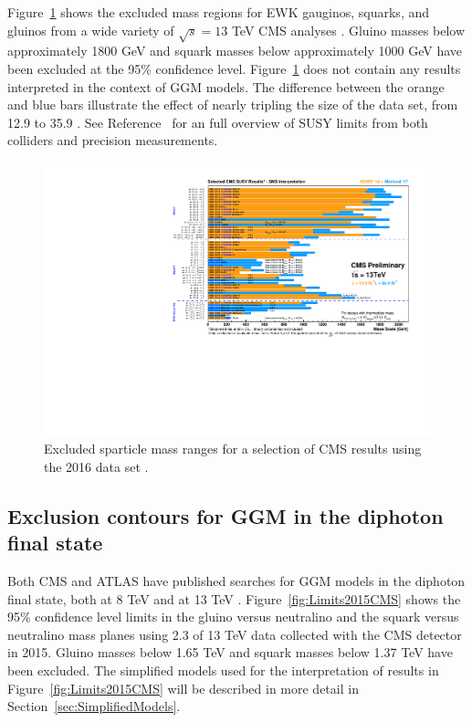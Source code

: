 Figure~\ref{fig:CMSexclusions} shows the excluded mass regions for EWK gauginos, squarks, and gluinos
from a wide variety of $\sqrt{s} = 13$ TeV CMS analyses \cite{SUSYtwiki}. Gluino masses below approximately 1800 GeV and 
squark masses below approximately 1000 GeV have been excluded at the 95\% confidence level. 
Figure~\ref{fig:CMSexclusions} does not contain any results interpreted in the context of GGM models.
The difference between the orange and blue bars illustrate the effect of nearly tripling the size of the
data set, from 12.9 \fbinv to 35.9 \fbinv. See Reference~\cite{pdgReview} for an full overview of SUSY 
limits from both colliders and precision measurements.

\begin{figure}[htbp]
    \centering
    \includegraphics[angle=90,origin=c,width=.9\textwidth]{Figures/Theory/Moriond2017_BarPlot.pdf}
    \caption[Excluded sparticle mass ranges for a selection of CMS results using the 2016 data set.]
    {Excluded sparticle mass ranges for a selection of CMS results using the 2016 data set \cite{SUSYtwiki}.}
    \label{fig:CMSexclusions}
\end{figure}

\subsection{Exclusion contours for GGM in the diphoton final state}
\label{sec:GMSBlimits}
Both CMS and ATLAS have published searches for GGM models in the diphoton final state, both at 8 TeV \cite{Aad:2015hea,Khachatryan:2015exa} and at 13 TeV \cite{ATLAS:2016aa,CMS:2015_anal}. Figure~\ref{fig:Limits2015CMS} shows the 95\% confidence level limits in the gluino versus neutralino and the squark versus neutralino mass planes using 2.3 \fbinv of 13 TeV data collected with the CMS detector in 2015. 
Gluino masses below 1.65 TeV and squark masses below 1.37 TeV have been excluded.
The simplified models used for the interpretation of results in Figure~\ref{fig:Limits2015CMS} will be described in more detail in Section~\ref{sec:SimplifiedModels}.

